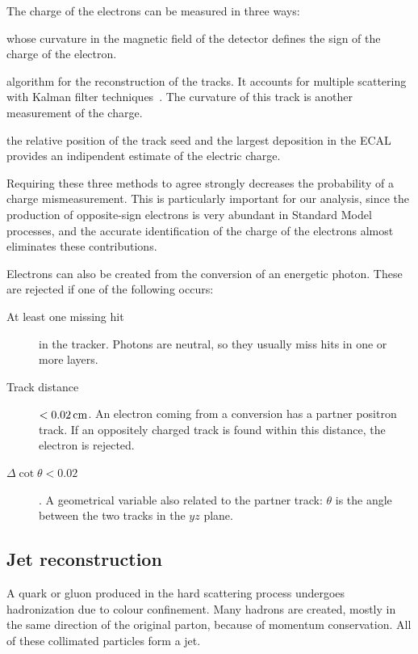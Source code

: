 The charge of the electrons can be measured in three ways:
\begin{description}\label{page:electron_charge}
    \item[The GSF track] whose curvature in the magnetic field of the
        detector defines the sign of the charge of the electron.
    \item[The CTF track] algorithm for the reconstruction of the
        tracks. It accounts for multiple scattering with Kalman filter
        techniques~\cite{springerlink:10.1140/epjc/s10052-006-0175-5}. The
        curvature of this track is another measurement of the charge.
    \item[Supercluster relative position] the relative position of the track seed
        and the largest deposition in the ECAL provides an indipendent
        estimate of the electric charge.
\end{description}
Requiring these three methods to agree strongly decreases the probability of
a charge mismeasurement. This is particularly important for our analysis,
since the production of opposite-sign electrons is very abundant in Standard
Model processes, and the accurate identification of the charge of the
electrons almost eliminates these contributions.

Electrons can also be created from the conversion of an energetic photon.
These are rejected if one of the following occurs:
\begin{description}
    \item[At least one missing hit] in the tracker. Photons are neutral, so they
        usually miss hits in one or more layers.
    \item[Track distance] $< \unit[0.02]{cm}$. An electron coming from a
        conversion has a partner positron track. If an oppositely charged
        track is found within this distance, the electron is rejected.
    \item[$\Delta \cot \theta < 0.02$]. A geometrical variable also related
        to the partner track: $\theta$ is the angle between the two tracks
        in the $yz$ plane.
\end{description}

\subsection{Jet reconstruction}\label{sec:jet_reco}
A quark or gluon produced in the hard scattering process undergoes
hadronization due to colour confinement. Many hadrons are created, mostly in
the same direction of the original parton, because of momentum conservation.
All of these collimated particles form a jet.

